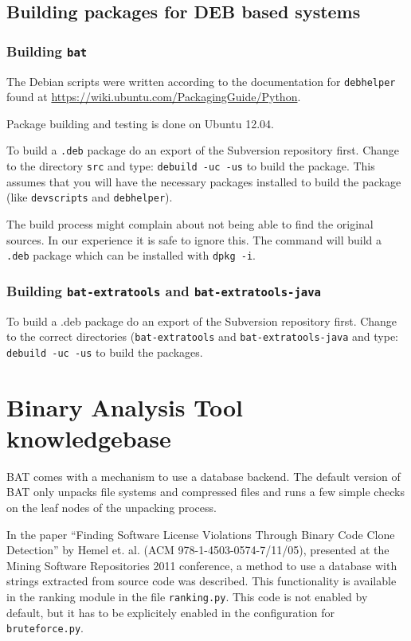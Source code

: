 \documentclass[10pt]{article}
\begin{document}
\subsection{Building packages for DEB based systems}

\subsubsection{Building \texttt{bat}}

The Debian scripts were written according to the documentation for
\texttt{debhelper} found at \url{https://wiki.ubuntu.com/PackagingGuide/Python}.

Package building and testing is done on Ubuntu 12.04.%

To build a \texttt{.deb} package do an export of the Subversion repository
first.  Change to the directory \texttt{src} and type:
\texttt{debuild -uc -us} to build the package. This assumes that you will have
the necessary packages installed to build the package (like \texttt{devscripts}
and \texttt{debhelper}).

The build process might complain about not being able to find the original
sources. In our experience it is safe to ignore this. The command will build a
\texttt{.deb} package which can be installed with \texttt{dpkg -i}.

\subsubsection{Building \texttt{bat-extratools} and
\texttt{bat-extratools-java}}

To build a .deb package do an export of the Subversion repository first. Change
to the correct directories (\texttt{bat-extratools} and 
\texttt{bat-extratools-java} and type: \texttt{debuild -uc -us} to
build the packages.

\section{Binary Analysis Tool knowledgebase}

BAT comes with a mechanism to use a database backend. The default version of
BAT only unpacks file systems and compressed files and runs a few simple checks
on the leaf nodes of the unpacking process.

In the paper ``Finding Software License Violations Through Binary Code Clone
Detection'' by Hemel et. al. (ACM 978-1-4503-0574-7/11/05), presented at
the Mining Software Repositories 2011 conference, a method to use a database
with strings extracted from source code was described. This functionality is
available in the ranking module in the file \texttt{ranking.py}. This code
is not enabled by default, but it has to be explicitely enabled in the
configuration for \texttt{bruteforce.py}.
\end{document}
